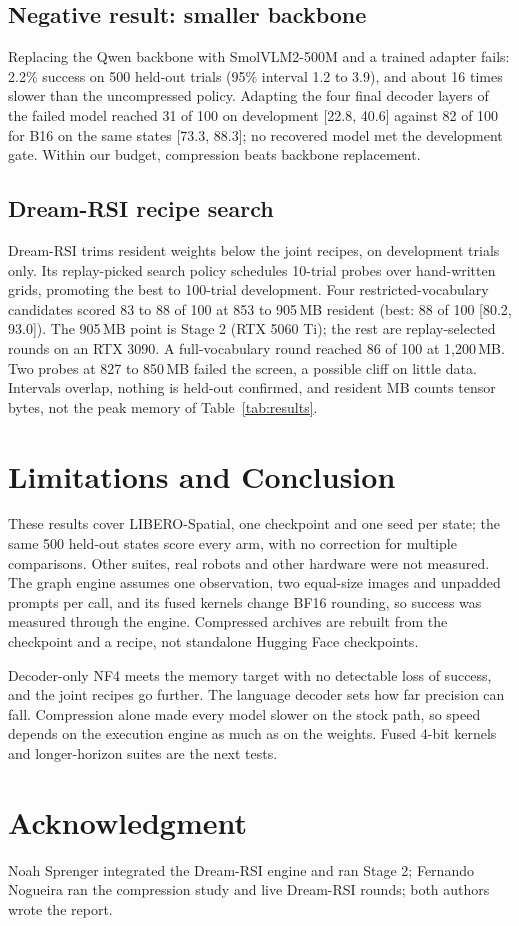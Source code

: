\documentclass[conference]{IEEEtran}
\begin{document}
\subsection{Negative result: smaller backbone}
Replacing the Qwen backbone with SmolVLM2-500M and a trained adapter fails: 2.2\% success on 500 held-out trials (95\% interval 1.2 to 3.9), and about 16 times slower than the uncompressed policy. Adapting the four final decoder layers of the failed model reached 31 of 100 on development [22.8, 40.6] against 82 of 100 for B16 on the same states [73.3, 88.3]; no recovered model met the development gate. Within our budget, compression beats backbone replacement.

\subsection{Dream-RSI recipe search}
Dream-RSI trims resident weights below the joint recipes, on development trials only. Its replay-picked search policy schedules 10-trial probes over hand-written grids, promoting the best to 100-trial development. Four restricted-vocabulary candidates scored 83 to 88 of 100 at 853 to 905\,MB resident (best: 88 of 100 [80.2, 93.0]). The 905\,MB point is Stage 2 (RTX 5060 Ti); the rest are replay-selected rounds on an RTX 3090. A full-vocabulary round reached 86 of 100 at 1,200\,MB. Two probes at 827 to 850\,MB failed the screen, a possible cliff on little data. Intervals overlap, nothing is held-out confirmed, and resident MB counts tensor bytes, not the peak memory of Table~\ref{tab:results}.

\section{Limitations and Conclusion}
These results cover LIBERO-Spatial, one checkpoint and one seed per state; the same 500 held-out states score every arm, with no correction for multiple comparisons. Other suites, real robots and other hardware were not measured. The graph engine assumes one observation, two equal-size images and unpadded prompts per call, and its fused kernels change BF16 rounding, so success was measured through the engine. Compressed archives are rebuilt from the checkpoint and a recipe, not standalone Hugging Face checkpoints.

Decoder-only NF4 meets the memory target with no detectable loss of success, and the joint recipes go further. The language decoder sets how far precision can fall. Compression alone made every model slower on the stock path, so speed depends on the execution engine as much as on the weights. Fused 4-bit kernels and longer-horizon suites are the next tests.

\section*{Acknowledgment}
Noah Sprenger integrated the Dream-RSI engine and ran Stage 2; Fernando Nogueira ran the compression study and live Dream-RSI rounds; both authors wrote the report.



\end{document}

